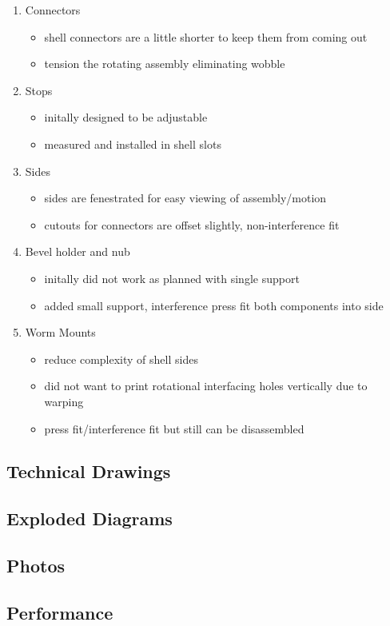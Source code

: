 \documentclass[11pt]{article}
\begin{document}
\begin{enumerate}
\item Connectors
\label{sec:org3b0b746}
\begin{itemize}
\item shell connectors are a little shorter to keep them from coming out
\item tension the rotating assembly eliminating wobble
\end{itemize}

\item Stops
\label{sec:org6a6e6d1}
\begin{itemize}
\item initally designed to be adjustable
\item measured and installed in shell slots
\end{itemize}

\item Sides
\label{sec:orgeb58cc6}
\begin{itemize}
\item sides are fenestrated for easy viewing of assembly/motion
\item cutouts for connectors are offset slightly, non-interference fit
\end{itemize}

\item Bevel holder and nub
\label{sec:orge660f46}
\begin{itemize}
\item initally did not work as planned with single support
\item added small support, interference press fit both components into side
\end{itemize}

\item Worm Mounts
\label{sec:org38eecd0}
\begin{itemize}
\item reduce complexity of shell sides
\item did not want to print rotational interfacing holes vertically due to warping
\item press fit/interference fit but still can be disassembled
\end{itemize}
\end{enumerate}

\subsection{Technical Drawings}
\label{sec:orge357887}

\subsection{Exploded Diagrams}
\label{sec:orga59c97c}

\subsection{Photos}
\label{sec:org7d65d02}

\subsection{Performance}
\label{sec:orgf67a789}
\end{document}
